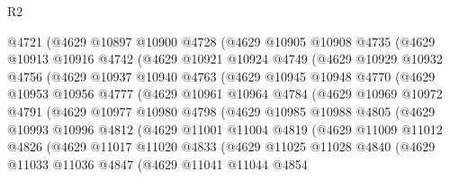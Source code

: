 \begin{lexlean}{R2}
\begin{coremodule}
        @4721
        (@4629
          @10897
          @10900
          @4728
          (@4629
            @10905
            @10908
            @4735
            (@4629
              @10913
              @10916
              @4742
              (@4629
                @10921
                @10924
                @4749
                (@4629
                  @10929
                  @10932
                  @4756
                  (@4629
                    @10937
                    @10940
                    @4763
                    (@4629
                      @10945
                      @10948
                      @4770
                      (@4629
                        @10953
                        @10956
                        @4777
                        (@4629
                          @10961
                          @10964
                          @4784
                          (@4629
                            @10969
                            @10972
                            @4791
                            (@4629
                              @10977
                              @10980
                              @4798
                              (@4629
                                @10985
                                @10988
                                @4805
                                (@4629
                                  @10993
                                  @10996
                                  @4812
                                  (@4629
                                    @11001
                                    @11004
                                    @4819
                                    (@4629
                                      @11009
                                      @11012
                                      @4826
                                      (@4629
                                        @11017
                                        @11020
                                        @4833
                                        (@4629
                                          @11025
                                          @11028
                                          @4840
                                          (@4629
                                            @11033
                                            @11036
                                            @4847
                                            (@4629
                                              @11041
                                              @11044
                                              @4854

\end{coremodule}
\end{lexlean}
